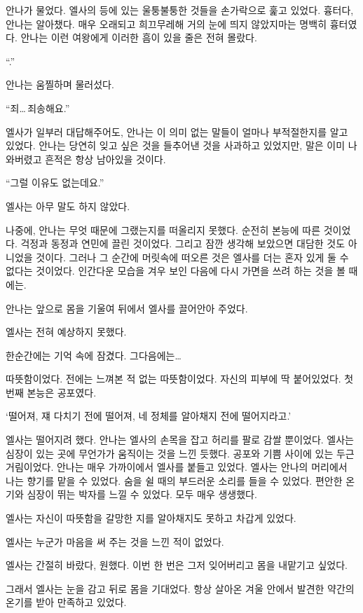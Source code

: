 안나가 물었다. 엘사의 등에 있는 울퉁불퉁한 것들을 손가락으로 훑고 있었다. 흉터다, 안나는 알아챘다. 매우 오래되고 희끄무레해 거의 눈에 띄지 않았지마는 명백히 흉터였다. 안나는 이런 여왕에게 이러한 흠이 있을 줄은 전혀 몰랐다.

``.''

안나는 움찔하며 물러섰다.

``죄\ldots\,죄송해요.''

엘사가 일부러 대답해주어도, 안나는 이 의미 없는 말들이 얼마나 부적절한지를 알고 있었다. 안나는 당연히 잊고 싶은 것을 들추어낸 것을 사과하고 있었지만, 말은 이미 나와버렸고 흔적은 항상 남아있을 것이다.

``그럴 이유도 없는데요.''

엘사는 아무 말도 하지 않았다.

나중에, 안나는 무엇 때문에 그랬는지를 떠올리지 못했다. 순전히 본능에 따른 것이었다. 걱정과 동정과 연민에 끌린 것이었다. 그리고 잠깐 생각해 보았으면 대담한 것도 아니었을 것이다. 그러나 그 순간에 머릿속에 떠오른 것은 엘사를 더는 혼자 있게 둘 수 없다는 것이었다. 인간다운 모습을 겨우 보인 다음에 다시 가면을 쓰려 하는 것을 볼 때에는.

안나는 앞으로 몸을 기울여 뒤에서 엘사를 끌어안아 주었다.

\textbreak

엘사는 전혀 예상하지 못했다.

한순간에는 기억 속에 잠겼다. 그다음에는\ldots

따뜻함이었다. 전에는 느껴본 적 없는 따뜻함이었다. 자신의 피부에 딱 붙어있었다. 첫 번째 본능은 공포였다.

`떨어져, 쟤 다치기 전에 떨어져, 네 정체를 알아채지 전에 떨어지라고.'

엘사는 떨어지려 했다. 안나는 엘사의 손목을 잡고 허리를 팔로 감쌀 뿐이었다. 엘사는 심장이 있는 곳에 무언가가 움직이는 것을 느낀 듯했다. 공포와 기쁨 사이에 있는 두근거림이었다. 안나는 매우 가까이에서 엘사를 붙들고 있었다. 엘사는 안나의 머리에서 나는 향기를 맡을 수 있었다. 숨을 쉴 때의 부드러운 소리를 들을 수 있었다. 편안한 온기와 심장이 뛰는 박자를 느낄 수 있었다. 모두 매우 생생했다.

엘사는 자신이 따뜻함을 갈망한 지를 알아채지도 못하고 차갑게 있었다.

엘사는 누군가 마음을 써 주는 것을 느낀 적이 없었다.

엘사는 간절히 바랐다, 원했다. 이번 한 번은 그저 잊어버리고 몸을 내맡기고 싶었다.

그래서 엘사는 눈을 감고 뒤로 몸을 기대었다. 항상 살아온 겨울 안에서 발견한 약간의 온기를 받아 만족하고 있었다.

